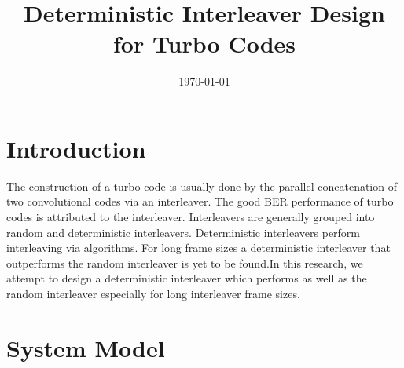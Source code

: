 \documentclass[twoside]{jarticle}
\title{Deterministic Interleaver Design for Turbo Codes}
\date{\today}
\begin{document}
\MKTITLE

\section{Introduction}
\vspace{-2mm}
The construction of a turbo code is usually done by the parallel concatenation of two
convolutional codes via an interleaver. The good BER performance of turbo codes is attributed to the interleaver. Interleavers are 
generally grouped into random and deterministic interleavers.  Deterministic interleavers perform interleaving via 
algorithms. For long frame sizes a deterministic interleaver that outperforms the random interleaver is yet to be found.In this research, we attempt to design a deterministic interleaver which performs as well as the random interleaver especially for long interleaver frame sizes.

\section{System Model}
\end{document}
